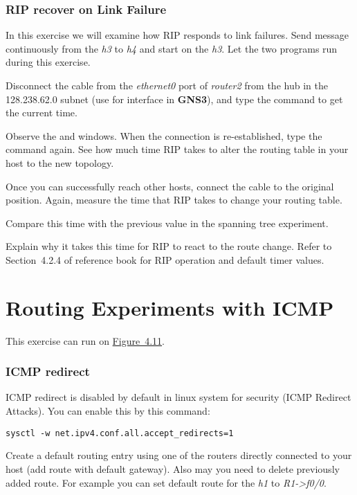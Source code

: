 \documentclass{../UTNetLab}
\begin{document}
\section{RIP recover on Link Failure}
In this exercise we will examine how RIP responds to link failures.
Send  message continuously from the \textit{h3} to \textit{h4} and start  on the \textit{h3}.
Let the two programs run during this exercise.

Disconnect the cable from the \textit{ethernet0} port of \textit{router2} from the hub in the 128.238.62.0 subnet (use  for interface in \textbf{GNS3}), and type the  command to get the current time.

Observe the  and  windows.
When the connection is re-established, type the  command again.
See how much time RIP takes to alter the routing table in your host to the new topology.

Once you can successfully reach other hosts, connect the cable to the original position.
Again, measure the time that RIP takes to change your routing table.

\begin{report}
    \item Compare this time with the previous value in the spanning tree experiment.

    \item Explain why it takes this time for RIP to react to the route change.
    Refer to Section~4.2.4 of reference book for RIP operation and default timer values.
\end{report}


\part{Routing Experiments with ICMP}
This exercise can run on \hyperref[fig:4.11]{Figure~4.11}.

\section{ICMP redirect}
ICMP redirect is disabled by default in linux system for security (ICMP Redirect Attacks).
You can enable this by this command:
\begin{lstlisting}
sysctl -w net.ipv4.conf.all.accept_redirects=1
    \end{lstlisting}

Create a default routing entry using one of the routers directly connected to your host (add route with default gateway).
Also may you need to delete previously added route.
For example you can set default route for the \textit{h1} to \textit{R1->f0/0}.
\end{document}
